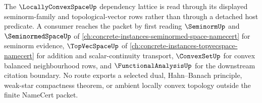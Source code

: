 The $\LocallyConvexSpaceUp$ dependency lattice is read through its displayed seminorm-family and topological-vector rows rather than through a detached host predicate. A consumer reaches the packet by first reading $\SeminormUp$ and $\SeminormedSpaceUp$ of \autoref{ch:concrete-instances-seminormed-space-namecert} for seminorm evidence, $\TopVecSpaceUp$ of \autoref{ch:concrete-instances-topvecspace-namecert} for addition and scalar-continuity transport, $\ConvexSetUp$ for convex balanced neighbourhood rows, and $\FunctionalAnalysisUp$ for the downstream citation boundary. No route exports a selected dual, Hahn--Banach principle, weak-star compactness theorem, or ambient locally convex topology outside the finite NameCert packet.
